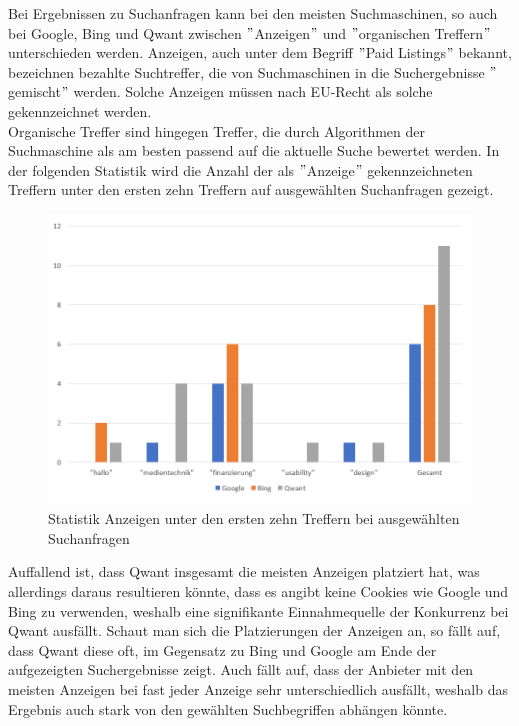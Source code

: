 Bei Ergebnissen zu Suchanfragen kann bei den meisten Suchmaschinen, so auch bei Google,
Bing und Qwant zwischen \("\)Anzeigen\("\) und \("\)organischen Treffern\("\) unterschieden werden.
Anzeigen, auch unter dem Begriff \("\)Paid Listings\("\) bekannt, bezeichnen bezahlte Suchtreffer,
die von Suchmaschinen in die Suchergebnisse \("\)gemischt\("\) werden.
Solche Anzeigen müssen nach EU-Recht als solche gekennzeichnet werden.\\
Organische Treffer sind hingegen Treffer, die durch Algorithmen der Suchmaschine als am besten passend auf die aktuelle Suche bewertet werden.
In der folgenden Statistik wird die Anzahl der als \("\)Anzeige\("\) gekennzeichneten Treffern unter den ersten zehn Treffern auf ausgewählten Suchanfragen gezeigt.\cite{LEW18}\\
\begin{figure}[ht]
    \centering
    \includegraphics[width=120mm]{images/statistic_adverts}
    \caption{Statistik Anzeigen unter den ersten zehn Treffern bei ausgewählten Suchanfragen}
    \label{fig:statisticAdverts}
\end{figure}
Auffallend ist, dass Qwant insgesamt die meisten Anzeigen platziert hat, was allerdings daraus resultieren könnte,
dass es angibt keine Cookies wie Google und Bing zu verwenden, weshalb eine signifikante Einnahmequelle der Konkurrenz bei Qwant ausfällt.
Schaut man sich die Platzierungen der Anzeigen an, so fällt auf, dass Qwant diese oft,
im Gegensatz zu Bing und Google am Ende der aufgezeigten Suchergebnisse zeigt.
Auch fällt auf, dass der Anbieter mit den meisten Anzeigen bei fast jeder Anzeige sehr unterschiedlich ausfällt,
weshalb das Ergebnis auch stark von den gewählten Suchbegriffen abhängen könnte.\\